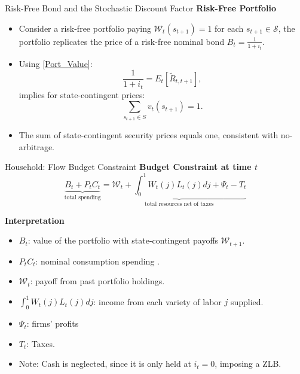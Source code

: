 \documentclass[11pt,aspectratio=169]{beamer}
\begin{document}
\begin{frame}{Risk-Free Bond and the Stochastic Discount Factor}
\small
\textbf{Risk-Free Portfolio}
\begin{itemize}
    \item Consider a risk-free portfolio paying $\mathcal{W}_t(s_{t+1}) = 1$ for each $s_{t+1}\in\mathcal{S}$, the portfolio replicates the price of a risk-free nominal bond $B_t = \frac{1}{1+i_t}$.
\item Using \eqref{Port_Value}:
\[
\frac{1}{1+i_t} = E_t[\tilde{R}_{t,t+1}],
\]
implies for state-contingent prices:
\[
\sum_{s_{t+1} \in S} v_t(s_{t+1}) = 1.
\]
    \item The sum of state-contingent security prices equals one, consistent with no-arbitrage.
\end{itemize}
\end{frame}
\begin{frame}{Household: Flow Budget Constraint}
\small
\textbf{Budget Constraint at time $t$}
\begin{equation}
\underbrace{B_t + P_t C_t}_{\text{total spending}} = \underbrace{\mathcal{W}_t + \int_0^1 W_t(j)L_t(j)dj + \Psi_t - T_t}_{\text{total resources net of taxes}}
\label{eq:household_bc}
\end{equation}

\textbf{Interpretation}
\begin{itemize}
    \item $B_t$: value of the portfolio with state-contingent payoffs $\mathcal{W}_{t+1}$.
    \item $P_t C_t$: nominal consumption spending .
    \item $\mathcal{W}_t$: payoff from past portfolio holdings.
    \item $\int_0^1 W_t(j)L_t(j)dj$: income from each variety of labor $j$ supplied.
    \item $\Psi_t$: firms’ profits
    \item $T_t$: Taxes.
    \item Note: Cash is neglected, since it is only held at $i_t = 0$, imposing a ZLB.
\end{itemize}
\end{frame}
\end{document}
